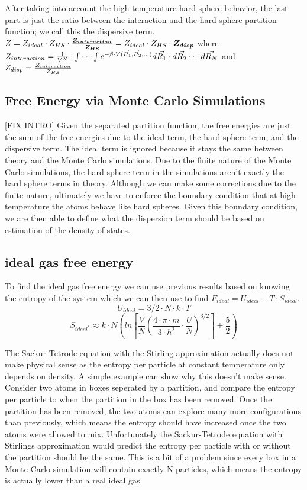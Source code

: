 After taking into account the high temperature hard sphere behavior, the last part is just the ratio between the interaction and the hard sphere partition function; we call this the dispersive term.
$\newline Z=Z_{ideal}\cdot Z_{HS}\cdot \boldsymbol{\frac{Z_{interaction}}{Z_{HS}}}=Z_{ideal}\cdot Z_{HS}\cdot \boldsymbol{Z_{disp}}\newline$
where $Z_{interaction}=\frac{1}{V^N}\cdot \int\cdot\cdot\cdot\int e^{-\beta\cdot V(\vec{R_1},\vec{R_2},...)}d\vec{R_1}\cdot d\vec{R_2}\cdot\cdot\cdot d\vec{R_N}\newline$
and $Z_{disp}= \frac{Z_{interaction}}{Z_{HS}}\newline$

\subsection{Free Energy via Monte Carlo Simulations}
[FIX INTRO]
Given the separated partition function, the free energies are just the sum of the free energies due to the ideal term, the hard sphere term, and the dispersive term. The ideal term is ignored because it stays the same between theory and the Monte Carlo simulations. Due to the finite nature of the Monte Carlo simulations, the hard sphere term in the simulations aren't exactly the hard sphere terms in theory. Although we can make some corrections due to the finite nature, ultimately we have to enforce the boundary condition that at high temperature the atoms behave like hard spheres. Given this boundary condition, we are then able to define what the dispersion term should be based on estimation of the density of states.
\subsection{ideal gas free energy}
To find the ideal gas free energy we can use previous results based on knowing the entropy of the system which we can then use to find $F_{ideal}=U_{ideal}-T\cdot S_{ideal}$.
$$U_{ideal}=3/2\cdot N\cdot k\cdot T$$
$$S_{ideal^*}\approx k\cdot N \left ( ln\left [ \frac{V}{N}\left ( \frac{4\cdot \pi\cdot m}{3\cdot h^2}\cdot \frac{U}{N} \right)^{3/2} \right]+\frac{5}{2}\right )$$

The Sackur-Tetrode equation with the Stirling approximation actually does not make physical sense as the entropy per particle at constant temperature only depends on density. A simple example can show why this doesn't make sense. Consider two atoms in boxes seperated by a partition, and compare the entropy per particle to when the partition in the box has been removed. Once the partition has been removed, the two atoms can explore many more configurations than previously, which means the entropy should have increased once the two atoms were allowed to mix. Unfortunately the Sackur-Tetrode equation with Stirlings approximation would predict the entropy per particle with or without the partition should be the same. This is a bit of a problem since every box in a Monte Carlo simulation will contain exactly N particles, which means the entropy is actually lower than a real ideal gas.

